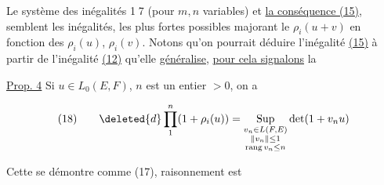 Le système des inégalités \textcircled{17} (pour $m,n$ variables) et \uline{la conséquence (15)}, semblent les inégalités, les plus fortes possibles majorant le  $\rho_i(u+v)$ en fonction des $\rho_i(u)$, $\rho_i(v)$. Notons qu'on pourrait déduire   l'inégalité \uline{(15)} à partir de l'inégalité \uline{(12)} qu'elle \uline{généralise}, \uline{pour cela signalons} la 

\uline{Prop. 4} Si $u\in L_0(E,F)$,  $n$ est un entier $>0$, on a

\[
\begin{array}{@{}l@{\qquad}l@{}}
(18) & \displaystyle \deleted{d}\prod_1^n(1+\rho_i(u))=\operatorname*{Sup}_{\substack{v_n\in L(F,E)\\\lVert v_n\rVert\leq1\\\operatorname{rang}v_n\leq n}}\det(1+v_nu)
\end{array}
\]

Cette   se démontre comme (17),   raisonnement est  



